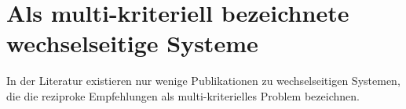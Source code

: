 \section{Als multi-kriteriell bezeichnete wechselseitige Systeme}



In der Literatur existieren nur wenige Publikationen zu wechselseitigen Systemen, die die reziproke Empfehlungen als multi-kriterielles Problem bezeichnen.


